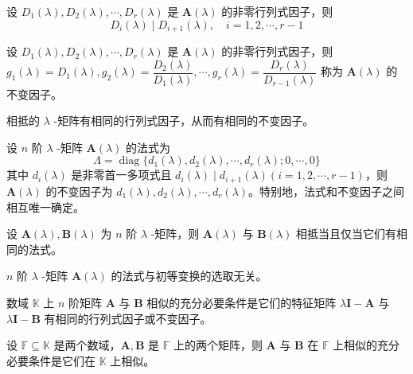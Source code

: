 \begin{lemma}
    设 $D_{1}(\lambda), D_{2}(\lambda), \cdots, D_{r}(\lambda)$ 是 $\bm{A}(\lambda)$ 的非零行列式因子，则
    \[
        D_{i}(\lambda) \mid D_{i + 1}(\lambda),\quad i = 1, 2, \cdots, r - 1
    \]
\end{lemma}

\begin{definition}
  设 $D_{1}(\lambda), D_{2}(\lambda), \cdots, D_{r}(\lambda)$ 是 $\bm{A}(\lambda)$ 的非零行列式因子，则 $g_{1}(\lambda) = D_{1}(\lambda), g_{2}(\lambda) = \dfrac{D_{2}(\lambda)}{D_{1}(\lambda)}, \cdots, g_{r}(\lambda) = \dfrac{D_{r}(\lambda)}{D_{r - 1}(\lambda)}$ 称为 $\bm{A}(\lambda)$ 的不变因子。
\end{definition}

\begin{theorem}
  相抵的 $\lambda$ -矩阵有相同的行列式因子，从而有相同的不变因子。
\end{theorem}

\begin{corollary}
  设 $n$ 阶 $\lambda$ -矩阵 $\bm{A}(\lambda)$ 的法式为
  \[
    \varLambda = \operatorname{diag}\{ d_{1}(\lambda), d_{2}(\lambda), \cdots, d_{r}(\lambda); 0, \cdots, 0 \}
    \]
    其中 $d_{i}(\lambda)$ 是非零首一多项式且 $d_{i}(\lambda) \mid d_{i + 1}(\lambda)(i = 1, 2, \cdots, r - 1)$，则 $\bm{A}(\lambda)$ 的不变因子为 $d_{1}(\lambda), d_{2}(\lambda), \cdots, d_{r}(\lambda)$。特别地，法式和不变因子之间相互唯一确定。
\end{corollary}

\begin{corollary}
  设 $\bm{A}(\lambda), \bm{B}(\lambda)$ 为 $n$ 阶 $\lambda$ -矩阵，则 $\bm{A}(\lambda)$ 与 $\bm{B}(\lambda)$ 相抵当且仅当它们有相同的法式。
\end{corollary}

\begin{corollary}
   $n$ 阶 $\lambda$ -矩阵 $\bm{A}(\lambda)$ 的法式与初等变换的选取无关。
\end{corollary}

\begin{theorem}
  数域 $\mathbb{K}$ 上 $n$ 阶矩阵 $\bm{A}$ 与 $\bm{B}$ 相似的充分必要条件是它们的特征矩阵 $\lambda \bm{I} - \bm{A}$ 与 $\lambda \bm{I} - \bm{B}$ 有相同的行列式因子或不变因子。
\end{theorem}

\begin{corollary}
  设 $\mathbb{F} \subseteq \mathbb{K}$ 是两个数域，$\bm{A}, \bm{B}$ 是 $\mathbb{F}$ 上的两个矩阵，则 $\bm{A}$ 与 $\bm{B}$ 在 $\mathbb{F}$ 上相似的充分必要条件是它们在 $\mathbb{K}$ 上相似。
\end{corollary}


